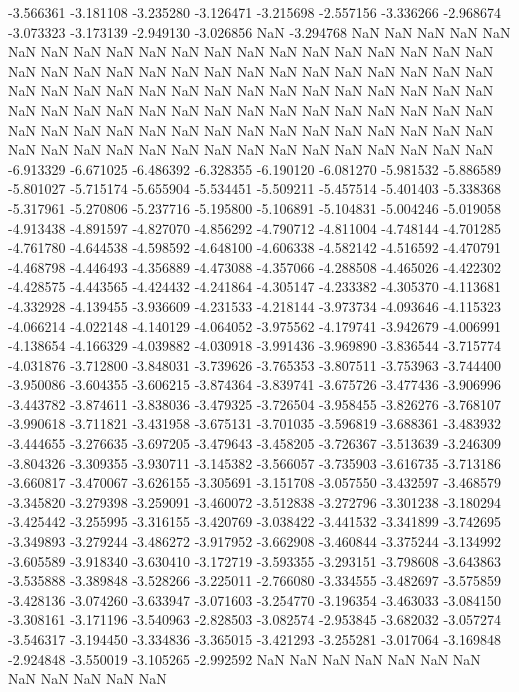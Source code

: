 -3.566361
-3.181108
-3.235280
-3.126471
-3.215698
-2.557156
-3.336266
-2.968674
-3.073323
-3.173139
-2.949130
-3.026856
NaN
-3.294768
NaN
NaN
NaN
NaN
NaN
NaN
NaN
NaN
NaN
NaN
NaN
NaN
NaN
NaN
NaN
NaN
NaN
NaN
NaN
NaN
NaN
NaN
NaN
NaN
NaN
NaN
NaN
NaN
NaN
NaN
NaN
NaN
NaN
NaN
NaN
NaN
NaN
NaN
NaN
NaN
NaN
NaN
NaN
NaN
NaN
NaN
NaN
NaN
NaN
NaN
NaN
NaN
NaN
NaN
NaN
NaN
NaN
NaN
NaN
NaN
NaN
NaN
NaN
NaN
NaN
NaN
NaN
NaN
NaN
NaN
NaN
NaN
NaN
NaN
NaN
NaN
NaN
NaN
NaN
NaN
NaN
NaN
NaN
NaN
NaN
NaN
NaN
NaN
NaN
NaN
NaN
NaN
NaN
NaN
NaN
-6.913329
-6.671025
-6.486392
-6.328355
-6.190120
-6.081270
-5.981532
-5.886589
-5.801027
-5.715174
-5.655904
-5.534451
-5.509211
-5.457514
-5.401403
-5.338368
-5.317961
-5.270806
-5.237716
-5.195800
-5.106891
-5.104831
-5.004246
-5.019058
-4.913438
-4.891597
-4.827070
-4.856292
-4.790712
-4.811004
-4.748144
-4.701285
-4.761780
-4.644538
-4.598592
-4.648100
-4.606338
-4.582142
-4.516592
-4.470791
-4.468798
-4.446493
-4.356889
-4.473088
-4.357066
-4.288508
-4.465026
-4.422302
-4.428575
-4.443565
-4.424432
-4.241864
-4.305147
-4.233382
-4.305370
-4.113681
-4.332928
-4.139455
-3.936609
-4.231533
-4.218144
-3.973734
-4.093646
-4.115323
-4.066214
-4.022148
-4.140129
-4.064052
-3.975562
-4.179741
-3.942679
-4.006991
-4.138654
-4.166329
-4.039882
-4.030918
-3.991436
-3.969890
-3.836544
-3.715774
-4.031876
-3.712800
-3.848031
-3.739626
-3.765353
-3.807511
-3.753963
-3.744400
-3.950086
-3.604355
-3.606215
-3.874364
-3.839741
-3.675726
-3.477436
-3.906996
-3.443782
-3.874611
-3.838036
-3.479325
-3.726504
-3.958455
-3.826276
-3.768107
-3.990618
-3.711821
-3.431958
-3.675131
-3.701035
-3.596819
-3.688361
-3.483932
-3.444655
-3.276635
-3.697205
-3.479643
-3.458205
-3.726367
-3.513639
-3.246309
-3.804326
-3.309355
-3.930711
-3.145382
-3.566057
-3.735903
-3.616735
-3.713186
-3.660817
-3.470067
-3.626155
-3.305691
-3.151708
-3.057550
-3.432597
-3.468579
-3.345820
-3.279398
-3.259091
-3.460072
-3.512838
-3.272796
-3.301238
-3.180294
-3.425442
-3.255995
-3.316155
-3.420769
-3.038422
-3.441532
-3.341899
-3.742695
-3.349893
-3.279244
-3.486272
-3.917952
-3.662908
-3.460844
-3.375244
-3.134992
-3.605589
-3.918340
-3.630410
-3.172719
-3.593355
-3.293151
-3.798608
-3.643863
-3.535888
-3.389848
-3.528266
-3.225011
-2.766080
-3.334555
-3.482697
-3.575859
-3.428136
-3.074260
-3.633947
-3.071603
-3.254770
-3.196354
-3.463033
-3.084150
-3.308161
-3.171196
-3.540963
-2.828503
-3.082574
-2.953845
-3.682032
-3.057274
-3.546317
-3.194450
-3.334836
-3.365015
-3.421293
-3.255281
-3.017064
-3.169848
-2.924848
-3.550019
-3.105265
-2.992592
NaN
NaN
NaN
NaN
NaN
NaN
NaN
NaN
NaN
NaN
NaN
NaN
